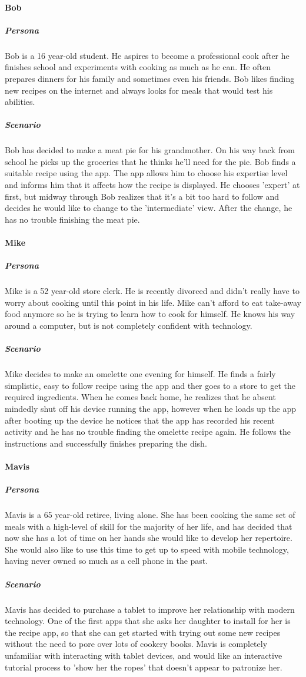 \paragraph{Bob}
\subparagraph{Persona}
Bob is a 16 year-old student. He aspires to become a professional cook after he 
finishes school and experiments with cooking as much as he can. He often prepares
dinners for his family and sometimes even his friends. Bob likes finding new
recipes on the internet and always looks for meals that would test his abilities.
\subparagraph{Scenario}
Bob has decided to make a meat pie for his grandmother. On his way back from 
school he picks up the groceries that he thinks he'll need for the pie. Bob finds
a suitable recipe using the app. The app allows him to choose his expertise level
and informs him that it affects how the recipe is displayed. He chooses 'expert'
at first, but midway through Bob realizes that it's a bit too hard to follow and
decides he would like to change to the 'intermediate' view. After the change, he
has no trouble finishing the meat pie.

\paragraph{Mike}
\subparagraph{Persona}
Mike is a 52 year-old store clerk. He is recently divorced and didn't really have
to worry about cooking until this point in his life. Mike can't afford to eat
take-away food anymore so he is trying to learn how to cook for himself. He knows
his way around a computer, but is not completely confident with technology.
\subparagraph{Scenario}
Mike decides to make an omelette one evening for himself. He finds a fairly 
simplistic, easy to follow recipe using the app and ther goes to a store to get
the required ingredients. When he comes back home, he realizes that he absent
mindedly shut off his device running the app, however when he loads up the 
app after booting up the device he notices that the app has recorded his 
recent activity and he has no trouble finding the omelette recipe again. He
follows the instructions and successfully finishes preparing the dish.

\paragraph{Mavis}
\subparagraph{Persona}
Mavis is a 65 year-old retiree, living alone. She has been cooking the same set 
of meals with a high-level of skill for the majority of her life, and has
decided that now she has a lot of time on her hands she would like to develop
her repertoire. She would also like to use this time to get up to speed with 
mobile technology, having never owned so much as a cell phone in the past.
\subparagraph{Scenario}
Mavis has decided to purchase a tablet to improve her relationship with modern
technology. One of the first apps that she asks her daughter to install for her
is the recipe app, so that she can get started with trying out some new recipes
without the need to pore over lots of cookery books. Mavis is completely 
unfamiliar with interacting with tablet devices, and would like an interactive 
tutorial process to 'show her the ropes' that doesn't appear to patronize her.

